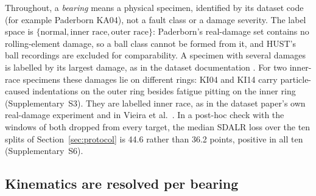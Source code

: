 Throughout, a \emph{bearing} means a physical specimen, identified by its dataset code (for example Paderborn KA04), not a
fault class or a damage severity. The label space is $\{\text{normal},\text{inner race},\text{outer race}\}$: Paderborn's
real-damage set contains no rolling-element damage, so a ball class cannot be formed from it, and HUST's ball recordings are
excluded for comparability. A specimen with several damages is labelled by its largest damage, as in the dataset
documentation \cite{lessmeier2016}. For two inner-race specimens these damages lie on different rings: KI04 and KI14
carry particle-caused indentations on the outer ring besides fatigue pitting on the inner ring (Supplementary~S3). They are labelled inner race,
as in the dataset paper's own real-damage experiment and in Vieira et al.\ \cite{vieira2026}. In a post-hoc check with the windows of
both dropped from every target, the median SDALR loss over the ten splits of Section~\ref{sec:protocol} is 44.6 rather than
36.2 points, positive in all ten (Supplementary~S6).

\subsection{Kinematics are resolved per bearing}
\label{sec:kinematics}


